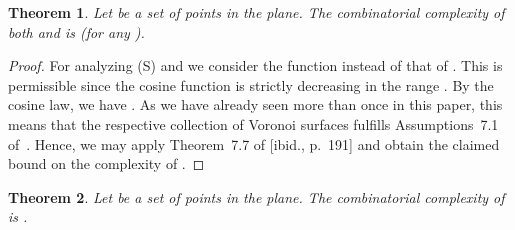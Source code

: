 \documentclass[10pt, conference, compsocconf]{IEEEtran}
\newtheorem{theorem}{Theorem}
\begin{document}
\begin{theorem}
   Let  be a set of  points in the plane.
   The combinatorial complexity of both  and 
   is  (for any ).
\end{theorem}

\begin{proof}
   For analyzing (S) and  we consider the function
    instead of that of .
   This is permissible since the cosine function is strictly decreasing in
   the range .
   By the cosine law, we have
   .
   As we have already seen more than once in this paper,
   this means that the respective collection of  Voronoi
   surfaces fulfills Assumptions~7.1 of~\cite[p.~188]{SA95}.
   Hence, we may apply Theorem~7.7 of [ibid., p.~191] and obtain the
   claimed bound on the complexity of .
\end{proof}

\begin{theorem}
   \label{TH-lb-angle-fn}
   Let  be a set of  points in the plane.
   The combinatorial complexity of  is .
\end{theorem}
\end{document}
